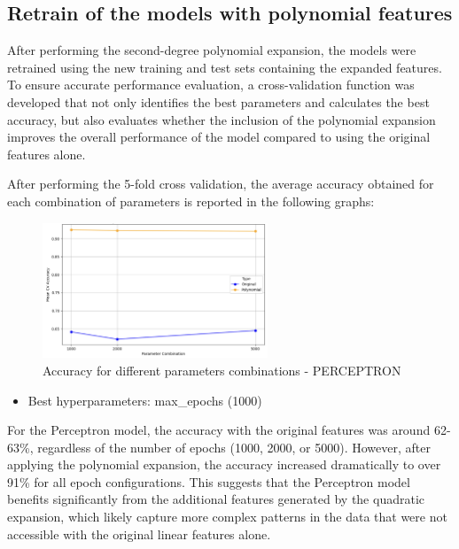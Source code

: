 \documentclass[a4paper, 10pt]{article}
\begin{document}
\newpage
\subsection{Retrain of the models with polynomial features}
After performing the second-degree polynomial expansion, the models were retrained using the new training and test sets containing the expanded features. To ensure accurate performance evaluation, a cross-validation function was developed that not only identifies the best parameters and calculates the best accuracy, but also evaluates whether the inclusion of the polynomial expansion improves the overall performance of the model compared to using the original features alone.

\vspace{0.5cm}
After performing the 5-fold cross validation, the average accuracy obtained for each combination of parameters is reported in the following graphs:

\begin{figure}[H]
    \centering
    \includegraphics[width=0.6\textwidth]{images/polyPER.png}
    \caption{Accuracy for different parameters combinations - PERCEPTRON}
    \label{fig:polyPER}
\end{figure}

\begin{itemize}
    \item Best hyperparameters: max\_epochs (1000)
\end{itemize}

For the Perceptron model, the accuracy with the original features was around 62-63\%, regardless of the number of epochs (1000, 2000, or 5000). However, after applying the polynomial expansion, the accuracy increased dramatically to over 91\% for all epoch configurations. This suggests that the Perceptron model benefits significantly from the additional features generated by the quadratic expansion, which likely capture more complex patterns in the data that were not accessible with the original linear features alone.
\end{document}
